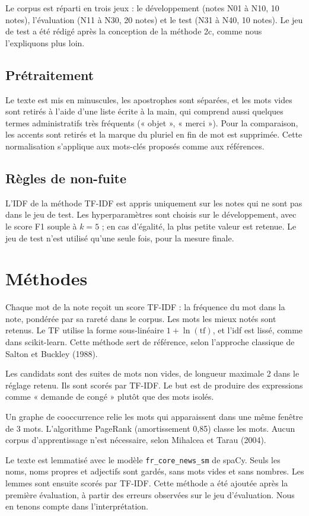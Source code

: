 \documentclass[11pt,a4paper]{article}
\begin{document}
Le corpus est réparti en trois jeux : le développement (notes N01 à N10, 10 notes), l'évaluation (N11 à N30, 20 notes) et le test (N31 à N40, 10 notes). Le jeu de test a été rédigé après la conception de la méthode 2c, comme nous l'expliquons plus loin.

\subsection{Prétraitement}

Le texte est mis en minuscules, les apostrophes sont séparées, et les mots vides sont retirés à l'aide d'une liste écrite à la main, qui comprend aussi quelques termes administratifs très fréquents (« objet », « merci »). Pour la comparaison, les accents sont retirés et la marque du pluriel en fin de mot est supprimée. Cette normalisation s'applique aux mots-clés proposés comme aux références.

\subsection{Règles de non-fuite}

L'IDF de la méthode TF-IDF est appris uniquement sur les notes qui ne sont pas dans le jeu de test. Les hyperparamètres sont choisis sur le développement, avec le score F1 souple à $k=5$ ; en cas d'égalité, la plus petite valeur est retenue. Le jeu de test n'est utilisé qu'une seule fois, pour la mesure finale.

\section{Méthodes}

\begin{description}[leftmargin=0pt,labelindent=0pt,itemsep=4pt]
\item[Baseline TF-IDF.] Chaque mot de la note reçoit un score TF-IDF : la fréquence du mot dans la note, pondérée par sa rareté dans le corpus. Les mots les mieux notés sont retenus. Le TF utilise la forme sous-linéaire $1 + \ln(\mathrm{tf})$, et l'idf est lissé, comme dans scikit-learn. Cette méthode sert de référence, selon l'approche classique de Salton et Buckley (1988).
\item[Approche 2a.] Les candidats sont des suites de mots non vides, de longueur maximale 2 dans le réglage retenu. Ils sont scorés par TF-IDF. Le but est de produire des expressions comme « demande de congé » plutôt que des mots isolés.
\item[Approche 2b (TextRank).] Un graphe de cooccurrence relie les mots qui apparaissent dans une même fenêtre de 3 mots. L'algorithme PageRank (amortissement 0,85) classe les mots. Aucun corpus d'apprentissage n'est nécessaire, selon Mihalcea et Tarau (2004).
\item[Approche 2c.] Le texte est lemmatisé avec le modèle \texttt{fr\_core\_news\_sm} de spaCy. Seuls les noms, noms propres et adjectifs sont gardés, sans mots vides et sans nombres. Les lemmes sont ensuite scorés par TF-IDF. Cette méthode a été ajoutée après la première évaluation, à partir des erreurs observées sur le jeu d'évaluation. Nous en tenons compte dans l'interprétation.
\end{description}
\end{document}
